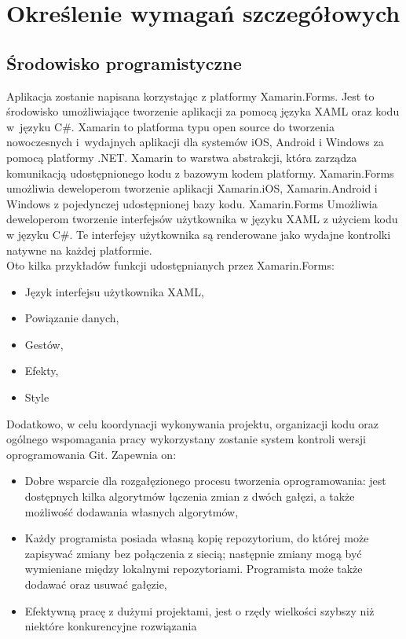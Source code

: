 \newpage
\section{Określenie wymagań szczegółowych}		%

\subsection{Środowisko programistyczne}  %

\hspace{0.60cm}Aplikacja zostanie napisana korzystając z platformy Xamarin.Forms. Jest to środowisko umożliwiające tworzenie aplikacji za pomocą języka XAML oraz kodu w~języku C\#.
Xamarin to platforma typu open source do tworzenia nowoczesnych i~wydajnych aplikacji dla systemów iOS, Android i Windows za pomocą platformy .NET. Xamarin to warstwa abstrakcji, która zarządza komunikacją udostępnionego kodu z bazowym kodem platformy. Xamarin.Forms umożliwia deweloperom tworzenie aplikacji Xamarin.iOS, Xamarin.Android i Windows z pojedynczej udostępnionej bazy kodu. Xamarin.Forms Umożliwia deweloperom tworzenie interfejsów użytkownika w języku XAML z użyciem kodu w języku C\#. Te interfejsy użytkownika są renderowane jako wydajne kontrolki natywne na każdej platformie. \\ Oto kilka przykładów funkcji udostępnianych przez Xamarin.Forms:

\begin{itemize}
	\item Język interfejsu użytkownika XAML,
	\item Powiązanie danych,
	\item Gestów,
	\item Efekty,
	\item Style
\end{itemize}

Dodatkowo, w celu koordynacji wykonywania projektu, organizacji kodu oraz ogólnego wspomagania pracy wykorzystany zostanie system kontroli wersji oprogramowania Git. Zapewnia on:

\begin{itemize}
	\item Dobre wsparcie dla rozgałęzionego procesu tworzenia oprogramowania: jest dostępnych kilka algorytmów łączenia zmian z dwóch gałęzi, a także możliwość dodawania własnych algorytmów,
	\item Każdy programista posiada własną kopię repozytorium, do której może zapisywać zmiany bez połączenia z siecią; następnie zmiany mogą być wymieniane między lokalnymi repozytoriami. Programista może także dodawać oraz usuwać gałęzie, 
	\item Efektywną pracę z dużymi projektami, jest o rzędy wielkości szybszy niż niektóre konkurencyjne rozwiązania
\end{itemize}

